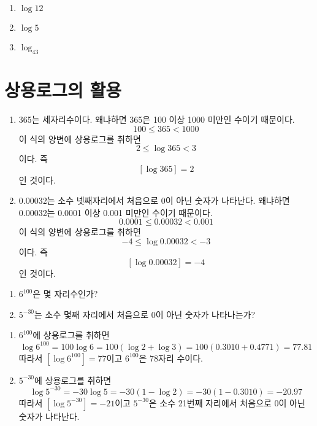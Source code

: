 \documentclass{oblivoir}
\begin{document}
%
\begin{enumerate}\label{common7}
\item
\(\log12\)
\item
\(\log5\)
\item
\(\log_43\)
\end{enumerate}

\newpage
\section{상용로그의 활용}
%
\exam{}
\begin{enumerate}\label{app1}
\item
365는 세자리수이다.
왜냐하면 365은 100 이상 1000 미만인 수이기 때문이다.
\[100\le365<1000\]
이 식의 양변에 상용로그를 취하면
\[2\le\log365<3\]
이다.
즉
\[[\log365]=2\]
인 것이다.
\begin{center}
\end{center}
\item
\(0.00032\)는 소수 넷째자리에서 처음으로 0이 아닌 숫자가 나타난다.
왜냐하면 0.00032는 0.0001 이상 0.001 미만인 수이기 때문이다.
\[0.0001\le0.00032<0.001\]
이 식의 양변에 상용로그를 취하면
\[-4\le\log0.00032<-3\]
이다.
즉
\[[\log0.00032]=-4\]
인 것이다.
\begin{center}
\end{center}
\end{enumerate}

\newpage
%
\begin{enumerate}\label{app2}
\item
\(6^{100}\)은 몇 자리수인가?
\item
\(5^{-30}\)는 소수 몇째 자리에서 처음으로 0이 아닌 숫자가 나타나는가?
\end{enumerate}
\begin{mdframed}
\begin{enumerate}
\item
\(6^{100}\)에 상용로그를 취하면
\[\log6^{100}=100\log6=100(\log2+\log3)=100(0.3010+0.4771)=77.81\]
따라서 \([\log6^{100}]=77\)이고 \(6^{100}\)은 78자리 수이다.
\item
\(5^{-30}\)에 상용로그를 취하면
\[\log5^{-30}=-30\log5=-30(1-\log2)=-30(1-0.3010)=-20.97\]
따라서 \([\log5^{-30}]=-21\)이고 \(5^{-30}\)은 소수 21번째 자리에서 처음으로 0이 아닌 숫자가 나타난다.
\end{enumerate}
\end{mdframed}
\end{document}
